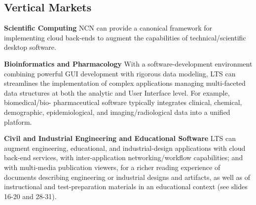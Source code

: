 
\begin{frame}{}
\section{Vertical Markets}

\vspace{8pt}
{\thrulex}

{\fontsize{17}{16}\selectfont
\hspace*{15pt}\begin{minipage}{.99\textwidth}
\vspace{-14pt}



		

{\setlength{\leftmargini}{3pt}\begin{enumerate}
\dmitem \textbf{Scientific Computing} \hspace{.5em} 
NCN can provide a canonical framework for 
implementing cloud back-ends to augment 
the capabilities of technical/scientific 
desktop software.
\vspace{14pt}


\dmitem \textbf{Bioinformatics and Pharmacology}  \hspace{.5em} 
With a software-development environment 
combining powerful GUI development with 
rigorous data modeling, LTS can streamlines 
the implementation of complex applications 
managing multi-faceted data structures 
at both the analytic and User Interface 
level.  For example, biomedical/bio- pharmaceutical 
software typically integrates 
clinical, chemical, demographic, epidemiological, 
and imaging/radiological data into a unified 
platform.
\vspace{14pt}

\dmitem \textbf{Civil and Industrial Engineering and 
Educational Software}  \hspace{.5em} 
LTS can augment engineering, educational, and 
industrial-design applications with cloud back-end 
services, with inter-application 
networking/workflow capabilities; and with 
multi-media publication viewers, for 
a richer reading experience of documents 
describing engineering or industrial 
designs and artifacts, as well as of 
instructional and test-preparation 
materials in an educational context 
(see slides 16-20 and 28-31).


\end{enumerate}}
\end{minipage}}
\end{frame}
